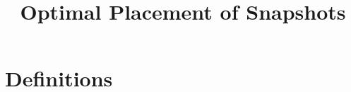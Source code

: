 \documentclass{article}
\begin{document}
\title{Optimal Placement of Snapshots}

\section{Definitions}
\end{document}
